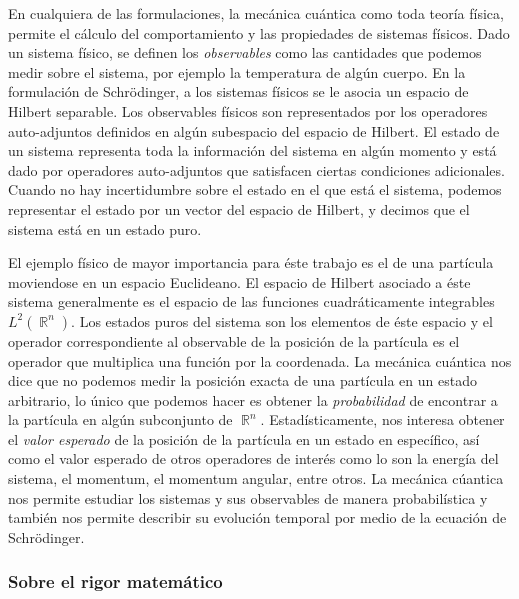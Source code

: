 \documentclass[a4paper]{report}
\DeclareMathOperator{\R}{\mathbb{R}}
\begin{document}
  En cualquiera de las formulaciones, la mecánica cuántica
  como toda teoría física, permite el cálculo del
  comportamiento y las propiedades de sistemas físicos. Dado
  un sistema físico, se definen los \textit{observables}
  como las cantidades que podemos medir sobre el sistema,
  por ejemplo la temperatura de algún cuerpo. En la
  formulación de Schrödinger, a los sistemas físicos se le
  asocia un espacio de Hilbert separable. Los observables
  físicos son representados por los operadores auto-adjuntos
  definidos en algún subespacio del espacio de Hilbert. El
  estado de un sistema representa toda la información del
  sistema en algún momento y está dado por operadores
  auto-adjuntos que satisfacen ciertas condiciones
  adicionales. Cuando no hay incertidumbre sobre el estado
  en el que está el sistema, podemos representar el estado
  por un vector del espacio de Hilbert, y decimos que el
  sistema está en un estado puro.

  El ejemplo físico de mayor importancia para éste trabajo
  es el de una partícula moviendose en un espacio
  Euclideano. El espacio de Hilbert asociado a éste sistema
  generalmente es el espacio de las funciones
  cuadráticamente integrables $L^2(\R^{n})$. Los estados
  puros del sistema son los elementos de éste espacio y el
  operador correspondiente al observable de la posición de
  la partícula es el operador que multiplica una función por
  la coordenada. La mecánica cuántica nos dice que no
  podemos medir la posición exacta de una partícula en un
  estado arbitrario, lo único que podemos hacer es obtener
  la \textit{probabilidad} de encontrar a la partícula en
  algún subconjunto de $\R^{n}$.  Estadísticamente, nos
  interesa obtener el \textit{valor esperado} de la posición
  de la partícula en un estado en específico, así como el
  valor esperado de otros operadores de interés como lo son
  la energía del sistema, el momentum, el momentum angular,
  entre otros. La mecánica cúantica nos permite estudiar los
  sistemas y sus observables de manera probabilística y
  también nos permite describir su evolución temporal por
  medio de la ecuación de Schrödinger. 

  \subsubsection{Sobre el rigor matemático}
\end{document}
